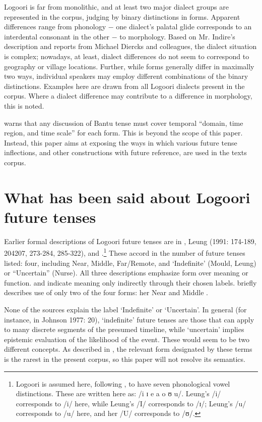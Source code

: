 \documentclass[output=paper]{langsci/langscibook}
\begin{document}
Logoori is far from monolithic, and at least two major dialect groups are represented in the corpus, judging by binary distinctions in forms. Apparent differences range from phonology $-$ one dialect’s palatal glide corresponds to an interdental consonant in the other $-$ to morphology. Based on Mr. Indire’s description and reports from Michael Diercks and colleagues, the dialect situation is complex; nowadays, at least, dialect differences do not seem to correspond to geography or village locations. Further, while forms generally differ in maximally two ways, individual speakers may employ different combinations of the binary distinctions. Examples here are drawn from all Logoori dialects present in the corpus. Where a dialect difference may contribute to a difference in morphology, this is noted.

\citet[12]{Botne2013} warns that any discussion of Bantu tense must cover temporal “domain, time region, and time scale” for each form. This is beyond the scope of this paper. Instead, this paper aims at exposing the ways in which various future tense inflections, and other constructions with future reference, are used in the texts corpus.

\section{What has been said about Logoori future tenses} \label{sec:sarvasy:2}

Earlier formal descriptions of Logoori future tenses are in \citet[206]{Mould1981}, Leung (1991: 174-189, 204207, 273-284, 285-322), and \citet[100]{Nurse2003}.\footnote{ Logoori is assumed here, following \citet{Leung1991}, to have seven phonological vowel distinctions. These are written here as: /i ɪ e a o ʊ u/. Leung’s /i/ corresponds to /i/ here, while Leung’s /I/ corresponds to /ɪ/; Leung’s /u/ corresponds to /u/ here, and her /U/ corresponds to /ʊ/.} These accord in the number of future tenses listed: four, including Near, Middle, Far/Remote, and ‘Indefinite’ %
%
%
%
%
(Mould, Leung) or “Uncertain” (Nurse). All three descriptions emphasize form over meaning or function. \citet{Mould1981} and \citet{Nurse2003} indicate meaning only indirectly through their chosen labels. \citet{Leung1991} briefly describes use of only two of the four forms: her Near \citet[174]{Future1991} and Middle \citet[285]{Future1991}. 

None of the sources explain the label ‘Indefinite’ or ‘Uncertain’. In general (for instance, in Johnson 1977: 20), ‘indefinite’ %
%
%
%
%
future tenses are those that can apply to many discrete segments of the presumed timeline, while ‘uncertain’ implies epistemic evaluation of the likelihood of the event. These would seem to be two different concepts. As described in , the relevant form designated by these terms is the rarest in the present corpus, so this paper will not resolve its semantics.
\end{document}

